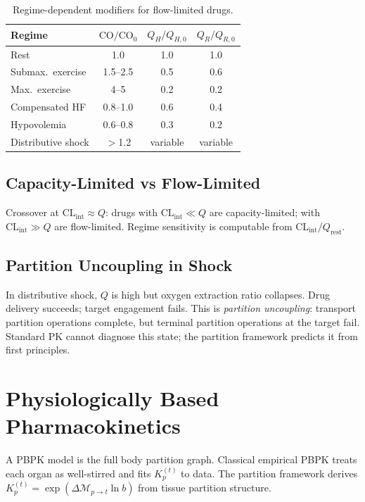 \documentclass[twocolumn,10pt,a4paper]{article}
\theoremstyle{definition}
\theoremstyle{remark}
\newcommand{\Depth}{\mathcal{M}}
\begin{document}
\begin{table}[H]
\centering
\footnotesize
\caption{Regime-dependent modifiers for flow-limited drugs.}
\label{tab:regimes}
\begin{tabular}{lccc}
\toprule
Regime & $\mathrm{CO}/\mathrm{CO}_0$ & $Q_H/Q_{H,0}$ & $Q_R/Q_{R,0}$ \\
\midrule
Rest & 1.0 & 1.0 & 1.0 \\
Submax.\ exercise & 1.5--2.5 & 0.5 & 0.6 \\
Max.\ exercise & 4--5 & 0.2 & 0.2 \\
Compensated HF & 0.8--1.0 & 0.6 & 0.4 \\
Hypovolemia & 0.6--0.8 & 0.3 & 0.2 \\
Distributive shock & $>$1.2 & variable & variable \\
\bottomrule
\end{tabular}
\end{table}

\subsection{Capacity-Limited vs Flow-Limited}

Crossover at $\mathrm{CL}_{\mathrm{int}} \approx Q$: drugs with $\mathrm{CL}_{\mathrm{int}}\ll Q$ are capacity-limited; with $\mathrm{CL}_{\mathrm{int}}\gg Q$ are flow-limited. Regime sensitivity is computable from $\mathrm{CL}_{\mathrm{int}}/Q_{\mathrm{rest}}$.

\subsection{Partition Uncoupling in Shock}

In distributive shock, $Q$ is high but oxygen extraction ratio collapses. Drug delivery succeeds; target engagement fails. This is \emph{partition uncoupling}: transport partition operations complete, but terminal partition operations at the target fail. Standard PK cannot diagnose this state; the partition framework predicts it from first principles.

\section{Physiologically Based Pharmacokinetics}

A PBPK model \citep{poulin_theil_2002,rodgers_rowland_2006} is the full body partition graph. Classical empirical PBPK treats each organ as well-stirred and fits $K_p^{(t)}$ to data. The partition framework derives $K_p^{(t)} = \exp(\Delta\Depth_{p\to t}\ln b)$ from tissue partition structure.
\end{document}
